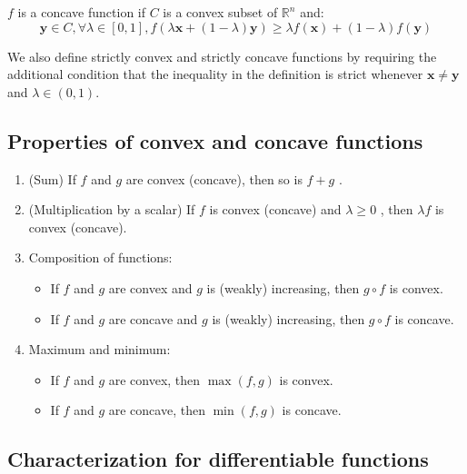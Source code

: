 \begin{definition}
    \(f\) is a concave function if \(C\) is a convex subset of \(\mathbb{R}^{n}\) and:
    \[
        \mathbf{y} \in C, \forall \lambda \in [0,1], f(\lambda \mathbf{x} + (1 - \lambda)\mathbf{y}) \geq \lambda f(\mathbf{x}) + (1 - \lambda)f(\mathbf{y})
    \]
\end{definition}

We also define strictly convex and strictly concave functions by requiring the additional condition that the inequality in the definition is strict whenever \(\mathbf{x} \neq \mathbf{y}\) and \(\lambda \in (0,1)\).

\subsection{Properties of convex and concave functions}
\begin{enumerate}
    \item
          (Sum) If \(f\) and \(g\) are convex (concave), then so is \(f + g\) .
    \item
          (Multiplication by a scalar) If \(f\) is convex (concave) and
          \(\lambda \geq 0\) , then \(\lambda f\) is convex (concave).
    \item
          Composition of functions:
          \begin{itemize}
              \item
                    If \(f\) and \(g\) are convex and \(g\) is (weakly) increasing, then
                    \(g \circ f\) is convex.
              \item
                    If \(f\) and \(g\) are concave and \(g\) is (weakly) increasing, then
                    \(g \circ f\) is concave.
          \end{itemize}
    \item
          Maximum and minimum:
          \begin{itemize}
              \item
                    If \(f\) and \(g\) are convex, then \(\max (f, g)\) is convex.
              \item
                    If \(f\) and \(g\) are concave, then \(\min (f, g)\) is concave.
          \end{itemize}
\end{enumerate}

\subsection{Characterization for differentiable functions}

